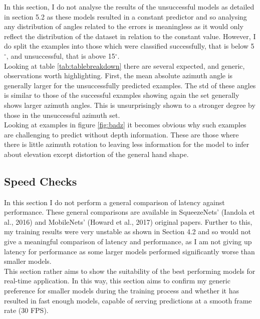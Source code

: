 \documentclass{article}
\begin{document}
In this section, I do not analyse the results of the unsuccessful models as detailed in section 5.2 as these models resulted in a constant predictor and so analysing any distribution of angles related to the errors is meaningless as it would only reflect the distribution of the dataset in relation to the constant value. However, I do split the examples into those which were classified successfully, that is below 5 $^{\circ}$, and unsuccessful, that is above 15$^{\circ}$. \\

Looking at table \ref{tab:tablebreakdown} there are several expected, and generic, observations worth highlighting. First, the mean absolute azimuth angle is generally larger for the unsuccessfully predicted examples. The std of these angles is similar to those of the successful examples showing again the set generally shows larger azimuth angles. 
This is unsurprisingly shown to a stronger degree by those in the unsuccessful azimuth set. \\

Looking at examples in figure \ref{fig:badz} it becomes obvious why such examples are challenging to predict without depth information. These are those where there is little azimuth rotation to leaving less information for the model to infer about elevation except distortion of the general hand shape. \\


\subsection{Speed Checks}
In this section I do not perform a general comparison of latency against performance. These general comparisons are available in SqueezeNets' (Iandola et al., 2016) and MobileNets' (Howard et al., 2017) original papers. Further to this, my training results were very unstable as shown in Section 4.2 and so would not give a meaningful comparison of latency and performance, as I am not giving up latency for performance as some larger models performed significantly worse than smaller models. \\

This section rather aims to show the suitability of the best performing models for real-time application. In this way, this section aims to confirm my generic preference for smaller models during the training process and whether it has resulted in fast enough models, capable of serving predictions at a smooth frame rate (30 FPS).\\
\end{document}
